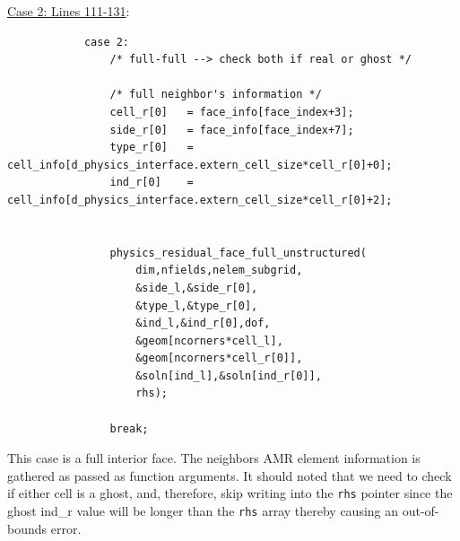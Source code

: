 \documentclass[11pt]{book}
\begin{document}
\noindent
\underline{Case 2: Lines 111-131}:
\begin{verbatim}
            case 2: 
                /* full-full --> check both if real or ghost */
                
                /* full neighbor's information */
                cell_r[0]   = face_info[face_index+3];
                side_r[0]   = face_info[face_index+7];
                type_r[0]   = cell_info[d_physics_interface.extern_cell_size*cell_r[0]+0];
                ind_r[0]    = cell_info[d_physics_interface.extern_cell_size*cell_r[0]+2];
                
                
                physics_residual_face_full_unstructured(
                    dim,nfields,nelem_subgrid,
                    &side_l,&side_r[0],
                    &type_l,&type_r[0],
                    &ind_l,&ind_r[0],dof,
                    &geom[ncorners*cell_l],
                    &geom[ncorners*cell_r[0]],
                    &soln[ind_l],&soln[ind_r[0]],
                    rhs);
                
                break;
\end{verbatim}
This case is a full interior face. The neighbors AMR element information is gathered as passed as function arguments. 
It should noted that we need to check if either cell is a ghost, and, therefore, skip writing into the \texttt{rhs} pointer 
since the ghost ind\_r value will be longer than the \texttt{rhs} array thereby causing an out-of-bounds error.
\newpage
\end{document}
